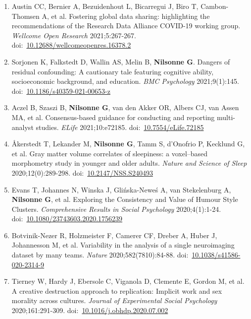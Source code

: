 \documentclass[11pt,a4paper]{article}
\begin{document}
\begin{enumerate}
\item Austin CC, Bernier A, Bezuidenhout L, Bicarregui J, Biro T, Cambon-Thomsen A, et al. Fostering global data sharing: highlighting the recommendations of the Research Data Alliance COVID-19 working group. \textit{Wellcome Open Research} 2021;5:267-267. doi:~\href{https://doi.org/10.12688/wellcomeopenres.16378.2}{10.12688/wellcomeopenres.16378.2}

\item Sorjonen K, Falkstedt D, Wallin AS, Melin B, \textbf{Nilsonne G}. Dangers of residual confounding: A cautionary tale featuring cognitive ability, socioeconomic background, and education. \textit{BMC Psychology} 2021;9(1):145. doi:~\href{https://doi.org/10.1186/s40359-021-00653-z}{10.1186/s40359-021-00653-z}

\item Aczel B, Szaszi B, \textbf{Nilsonne G}, van den Akker OR, Albers CJ, van Assen MA, et al. Consensus-based guidance for conducting and reporting multi-analyst studies. \textit{ELife} 2021;10:e72185. doi:~\href{https://doi.org/10.7554/eLife.72185}{10.7554/eLife.72185}

\item Åkerstedt T, Lekander M, \textbf{Nilsonne G}, Tamm S, d'Onofrio P, Kecklund G, et al. Gray matter volume correlates of sleepiness: a voxel–based morphometry study in younger and older adults. \textit{Nature and Science of Sleep} 2020;12(0):289-298. doi:~\href{https://doi.org/10.2147/NSS.S240493}{10.2147/NSS.S240493}

\item Evans T, Johannes N, Winska J, Glińska-Neweś A, van Stekelenburg A, \textbf{Nilsonne G}, et al. Exploring the Consistency and Value of Humour Style Clusters. \textit{Comprehensive Results in Social Psychology} 2020;4(1):1-24. doi:~\href{https://doi.org/10.1080/23743603.2020.1756239}{10.1080/23743603.2020.1756239}

\item Botvinik-Nezer R, Holzmeister F, Camerer CF, Dreber A, Huber J, Johannesson M, et al. Variability in the analysis of a single neuroimaging dataset by many teams. \textit{Nature} 2020;582(7810):84-88. doi:~\href{https://doi.org/10.1038/s41586-020-2314-9}{10.1038/s41586-020-2314-9}

\item Tierney W, Hardy J, Ebersole C, Viganola D, Clemente E, Gordon M, et al. A creative destruction approach to replication: Implicit work and sex morality across cultures. \textit{Journal of Experimental Social Psychology} 2020;161:291-309. doi:~\href{https://doi.org/10.1016/j.obhdp.2020.07.002}{10.1016/j.obhdp.2020.07.002}


\end{enumerate}
\end{document}
